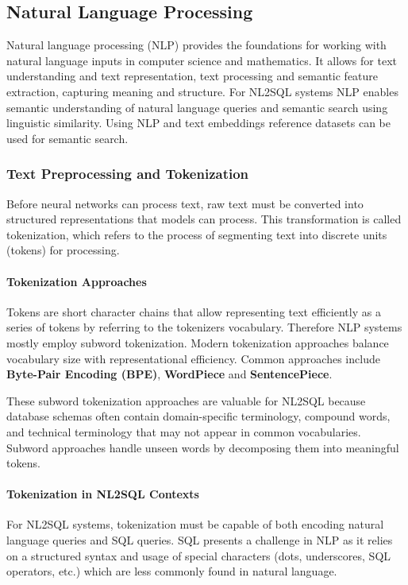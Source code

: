 \subsection{Natural Language Processing}

Natural language processing (NLP) provides the foundations for working with
natural language inputs in computer science and mathematics. It allows for text
understanding and text representation, text processing and semantic feature
extraction, capturing meaning and structure. For NL2SQL systems NLP enables
semantic understanding of natural language queries and semantic search using
linguistic similarity. Using NLP and text embeddings reference datasets can be
used for semantic search.

\subsubsection{Text Preprocessing and Tokenization}

Before neural networks can process text, raw text must be converted into
structured representations that models can process. This transformation is
called tokenization, which refers to the process of segmenting text into
discrete units (tokens) for processing.

\paragraph{Tokenization Approaches}

Tokens are short character chains that allow representing text efficiently as a
series of tokens by referring to the tokenizers vocabulary. Therefore NLP
systems mostly employ subword tokenization. Modern tokenization approaches
balance vocabulary size with representational efficiency. Common approaches
include \textbf{Byte-Pair Encoding (BPE)}, \textbf{WordPiece} and
\textbf{SentencePiece}.

These subword tokenization approaches are valuable for NL2SQL because database
schemas often contain domain-specific terminology, compound words, and
technical terminology that may not appear in common vocabularies. Subword
approaches handle unseen words by decomposing them into meaningful tokens.

\paragraph{Tokenization in NL2SQL Contexts}

For NL2SQL systems, tokenization must be capable of both encoding natural
language queries and SQL queries. SQL presents a challenge in NLP as it relies
on a structured syntax and usage of special characters (dots, underscores,
SQL operators, etc.) which are less commonly found in natural language.

